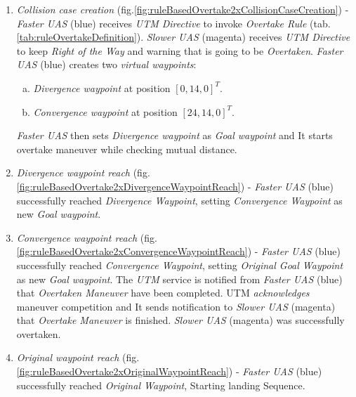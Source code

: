     \begin{enumerate}
        \item \emph{Collision case creation} (fig.\ref{fig:ruleBasedOvertake2xCollisionCaseCreation}) - \emph{Faster UAS} (blue) receives \emph{UTM Directive} to invoke \emph{Overtake Rule} (tab. \ref{tab:ruleOvertakeDefinition}). \emph{Slower UAS} (magenta) receives \emph{UTM Directive} to keep \emph{Right of the Way} and warning that is going to be \emph{Overtaken}. \emph{Faster UAS} (blue) creates two \emph{virtual waypoints}:
        \begin{enumerate}[a.]
            \item \emph{Divergence waypoint} at position $[0,14,0]^T$.
            \item \emph{Convergence waypoint} at position $[24,14,0]^T$.
        \end{enumerate}
        \emph{Faster UAS} then sets \emph{Divergence waypoint} as \emph{Goal waypoint} and It starts overtake maneuver while checking mutual distance.
        
        \item \emph{Divergence waypoint reach} (fig. \ref{fig:ruleBasedOvertake2xDivergenceWaypointReach}) - \emph{Faster UAS} (blue) successfully reached \emph{Divergence Waypoint}, setting \emph{Convergence Waypoint} as new \emph{Goal waypoint}.
        
        \item \emph{Convergence waypoint reach} (fig. \ref{fig:ruleBasedOvertake2xConvergenceWaypointReach}) - \emph{Faster UAS} (blue) successfully reached \emph{Convergence Waypoint}, setting \emph{Original Goal Waypoint} as new \emph{Goal waypoint}. The \emph{UTM} service is notified from \emph{Faster UAS} (blue) that \emph{Overtaken Maneuver} have been completed. UTM \emph{acknowledges} maneuver competition and It sends notification to \emph{Slower UAS} (magenta) that \emph{Overtake Maneuver} is finished. \emph{Slower UAS} (magenta) was successfully overtaken.
        
        \item \emph{Original waypoint reach} (fig. \ref{fig:ruleBasedOvertake2xOriginalWaypointReach}) - \emph{Faster UAS} (blue) successfully reached \emph{Original Waypoint}, Starting landing Sequence. 
    \end{enumerate}


